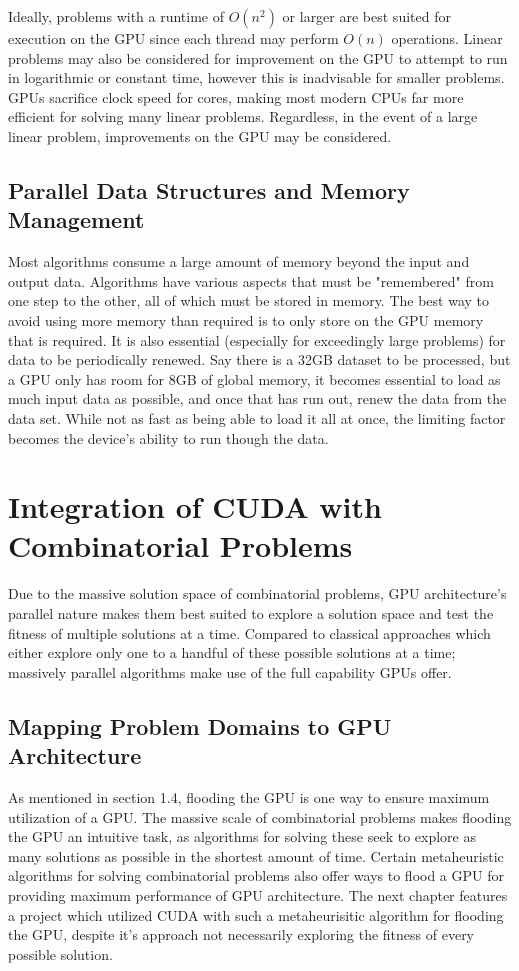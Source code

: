 \documentclass[11pt]{report}
\begin{document}
        Ideally, problems with a runtime of $O(n^2)$ or larger are best suited for execution on the GPU since each thread may perform $O(n)$ operations. Linear problems may also be considered for improvement on the GPU to attempt to run in logarithmic or constant time, however this is inadvisable for smaller problems. GPUs sacrifice clock speed for cores, making most modern CPUs far more efficient for solving many linear problems. Regardless, in the event of a large linear problem, improvements on the GPU may be considered. 
        
        \subsection{Parallel Data Structures and Memory Management}
        Most algorithms consume a large amount of memory beyond the input and output data. Algorithms have various aspects that must be "remembered" from one step to the other, all of which must be stored in memory. The best way to avoid using more memory than required is to only store on the GPU memory that is required. It is also essential (especially for exceedingly large problems) for data to be periodically renewed. Say there is a 32GB dataset to be processed, but a GPU only has room for 8GB of global memory, it becomes essential to load as much input data as possible, and once that has run out, renew the data from the data set. While not as fast as being able to load it all at once, the limiting factor becomes the device's ability to run though the data.


    \section{Integration of CUDA with Combinatorial Problems}
    Due to the massive solution space of combinatorial problems, GPU architecture's parallel nature makes them best suited to explore a solution space and test the fitness of multiple solutions at a time. Compared to classical approaches which either explore only one to a handful of these possible solutions at a time; massively parallel algorithms make use of the full capability GPUs offer.
    
        \subsection{Mapping Problem Domains to GPU Architecture}
        As mentioned in section 1.4, flooding the GPU is one way to ensure maximum utilization of a GPU. The massive scale of combinatorial problems makes flooding the GPU an intuitive task, as algorithms for solving these seek to explore as many solutions as possible in the shortest amount of time. Certain metaheuristic algorithms for solving combinatorial problems also offer ways to flood a GPU for providing maximum performance of GPU architecture. The next chapter features a project which utilized CUDA with such a metaheurisitic algorithm for flooding the GPU, despite it's approach not necessarily exploring the fitness of every possible solution.
        
\end{document}
